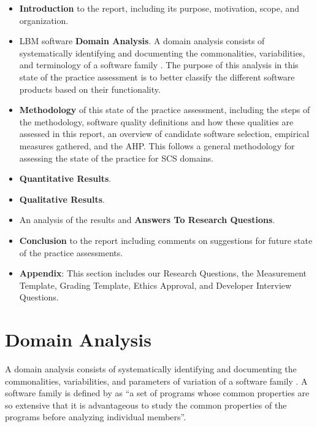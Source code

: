 \documentclass[12pt, notitlepage]{article}
\begin{document}
\begin{itemize}
	\item \textbf{Introduction} to the report, including its purpose, motivation, scope, and organization.
	\item LBM software \textbf{Domain Analysis}. A domain analysis consists of systematically identifying and documenting the commonalities, variabilities, and terminology of a software family \citep{Weiss1997}.
	The purpose of this analysis in this state of the practice assessment is to better classify the different software products based on their functionality.
	\item \textbf{Methodology} of this state of the practice assessment, including the steps of the methodology, software quality definitions and how these qualities are assessed in this report, an overview of candidate software selection, empirical measures gathered, and the AHP. This follows a general methodology for assessing the state of the practice for SCS domains.
	\item \textbf{Quantitative Results}. 
	\item \textbf{Qualitative Results}. 
	\item An analysis of the results and \textbf{Answers To Research Questions}.
	\item \textbf{Conclusion} to the report including comments on suggestions for future state of the practice assessments.
	\item \textbf{Appendix}: This section includes our Research Questions, the Measurement Template, Grading Template, Ethics Approval, and Developer Interview Questions.
\end{itemize}

\newpage

\section{Domain Analysis}\label{domainanalysis}

A domain analysis consists of systematically identifying and documenting the commonalities, variabilities, and parameters of variation of a software family \citep{Weiss1997}. A software family is defined by \cite{parnas1976design} as “a set of programs whose common properties are so extensive that it is advantageous to study the common properties of the programs before analyzing individual members”. 
\end{document}
